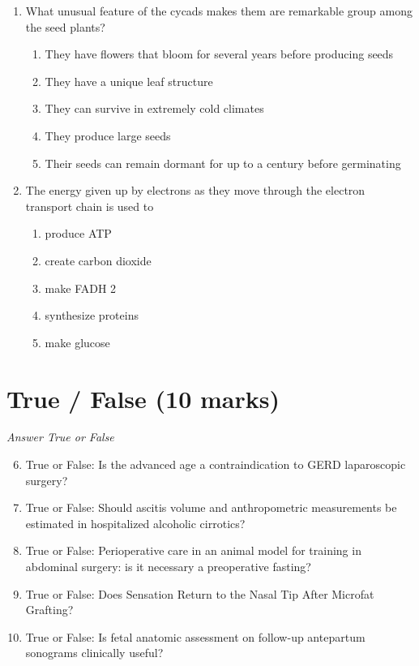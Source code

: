\documentclass[12pt]{article}
\begin{document}
\begin{enumerate}[label=\arabic*.]
\begin{enumerate}[label=(\alph*)]
    \item The presence of two Y chromosomes determines that an individual will be male.
\end{enumerate}
\item What unusual feature of the cycads makes them are remarkable group among the seed plants?
\begin{enumerate}[label=(\alph*)]
    \item They have flowers that bloom for several years before producing seeds
    \item They have a unique leaf structure
    \item They can survive in extremely cold climates
    \item They produce large seeds
    \item Their seeds can remain dormant for up to a century before germinating
\end{enumerate}
\item The energy given up by electrons as they move through the electron transport chain is used to
\begin{enumerate}[label=(\alph*)]
    \item produce ATP
    \item create carbon dioxide
    \item make FADH 2
    \item synthesize proteins
    \item make glucose
\end{enumerate}
\end{enumerate}

\section*{True / False (10 marks)}
\textit{Answer True or False}
\begin{enumerate}[label=\arabic*.]
\setcounter{enumi}{5}
\item True or False: Is the advanced age a contraindication to GERD laparoscopic surgery?
\item True or False: Should ascitis volume and anthropometric measurements be estimated in hospitalized alcoholic cirrotics?
\item True or False: Perioperative care in an animal model for training in abdominal surgery: is it necessary a preoperative fasting?
\item True or False: Does Sensation Return to the Nasal Tip After Microfat Grafting?
\item True or False: Is fetal anatomic assessment on follow-up antepartum sonograms clinically useful?
\end{enumerate}
\end{document}
